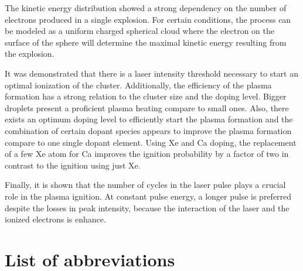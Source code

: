 \documentclass[a4paper,12pt,bibtotocnumbered, twosite]{scrreprt}
\begin{document}
The kinetic energy distribution showed a strong dependency on the number of electrons produced in a single explosion. For certain conditions, the process can be modeled as a uniform charged spherical cloud where the electron on the surface of the sphere will determine the maximal kinetic energy resulting from the explosion. 

It was demonstrated that there is a laser intensity threshold necessary to start an optimal ionization of the cluster. Additionally, the efficiency of the plasma formation has a strong relation to the cluster size and the doping level. Bigger droplets present a proficient plasma heating compare to small ones. Also, there exists an optimum doping level to efficiently start the plasma formation and the combination of certain dopant species appears to improve the plasma formation compare to one single dopant element. Using Xe and Ca doping, the replacement of a few Xe atom for Ca improves the ignition probability by a factor of two in contrast to the ignition using just Xe. 


Finally, it is shown that the number of cycles in the laser pulse plays a crucial role in the plasma ignition. At constant pulse energy, a longer pulse is preferred despite the losses in peak intensity, because the interaction of the laser and the ionized electrons is enhance.




\newpage

\tableofcontents
\chapter*{List of abbreviations}
\begin{acronym}[DARAM]

  
\end{acronym}
\cleardoublepage{}
\end{document}
